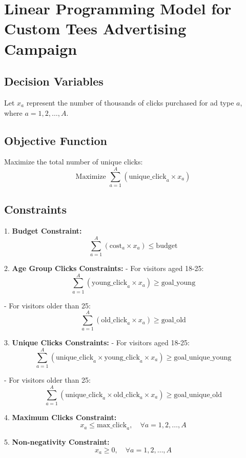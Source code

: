 \documentclass{article}
\begin{document}
\section*{Linear Programming Model for Custom Tees Advertising Campaign}

\subsection*{Decision Variables}
Let \( x_a \) represent the number of thousands of clicks purchased for ad type \( a \), where \( a = 1, 2, \ldots, A \).

\subsection*{Objective Function}
Maximize the total number of unique clicks:
\[
\text{Maximize } \sum_{a=1}^{A} \left( \text{unique\_click}_a \times x_a \right)
\]

\subsection*{Constraints}

1. \textbf{Budget Constraint:}
   \[
   \sum_{a=1}^{A} \left( \text{cost}_a \times x_a \right) \leq \text{budget}
   \]

2. \textbf{Age Group Clicks Constraints:}
   - For visitors aged 18-25:
   \[
   \sum_{a=1}^{A} \left( \text{young\_click}_a \times x_a \right) \geq \text{goal\_young}
   \]

   - For visitors older than 25:
   \[
   \sum_{a=1}^{A} \left( \text{old\_click}_a \times x_a \right) \geq \text{goal\_old}
   \]

3. \textbf{Unique Clicks Constraints:}
   - For visitors aged 18-25:
   \[
   \sum_{a=1}^{A} \left( \text{unique\_click}_a \times \text{young\_click}_a \times x_a \right) \geq \text{goal\_unique\_young}
   \]

   - For visitors older than 25:
   \[
   \sum_{a=1}^{A} \left( \text{unique\_click}_a \times \text{old\_click}_a \times x_a \right) \geq \text{goal\_unique\_old}
   \]

4. \textbf{Maximum Clicks Constraint:}
   \[
   x_a \leq \text{max\_click}_a, \quad \forall a = 1, 2, \ldots, A
   \]

5. \textbf{Non-negativity Constraint:}
   \[
   x_a \geq 0, \quad \forall a = 1, 2, \ldots, A
   \]
\end{document}
